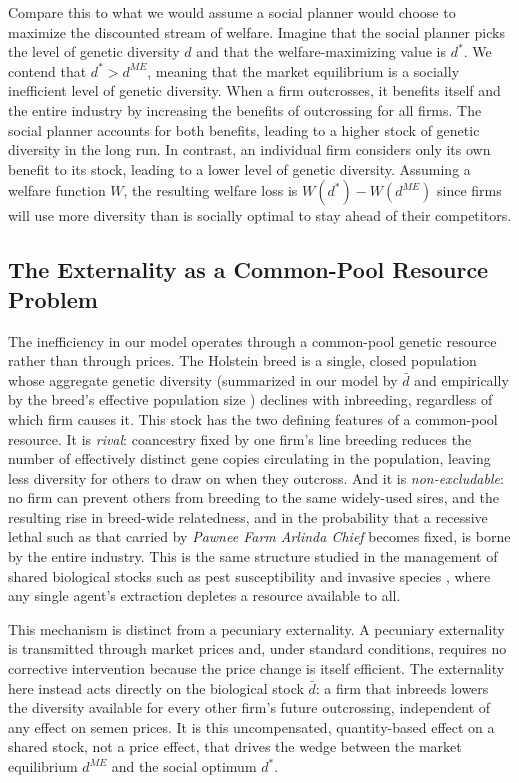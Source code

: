 \documentclass[12pt,letterpaper]{article}
\begin{document}
Compare this to what we would assume a social planner would choose to maximize the discounted stream of welfare. Imagine that the social planner picks the level of genetic diversity $d$ and that the welfare-maximizing value is $d^{*}$. We contend that $d^*>d^{ME}$, meaning that the market equilibrium is a socially inefficient level of genetic diversity. When a firm outcrosses, it benefits itself and the entire industry by increasing the benefits of outcrossing for all firms. The social planner accounts for both benefits, leading to a higher stock of genetic diversity in the long run. In contrast, an individual firm considers only its own benefit to its stock, leading to a lower level of genetic diversity. Assuming a welfare function $W$, the resulting welfare loss is $W(d^*)-W(d^{ME})$ since firms will use more diversity than is socially optimal to stay ahead of their competitors.

\subsection{The Externality as a Common-Pool Resource Problem}

The inefficiency in our model operates through a common-pool genetic resource rather than through prices. The Holstein breed is a single, closed population whose aggregate genetic diversity (summarized in our model by $\bar{d}$ and empirically by the breed's effective population size \citep{Makanjuola2020}) declines with inbreeding, regardless of which firm causes it. This stock has the two defining features of a common-pool resource. It is \emph{rival}: coancestry fixed by one firm's line breeding reduces the number of effectively distinct gene copies circulating in the population, leaving less diversity for others to draw on when they outcross. And it is \emph{non-excludable}: no firm can prevent others from breeding to the same widely-used sires, and the resulting rise in breed-wide relatedness, and in the probability that a recessive lethal such as that carried by \textit{Pawnee Farm Arlinda Chief} \citep{Adams2016} becomes fixed, is borne by the entire industry. This is the same structure studied in the management of shared biological stocks such as pest susceptibility and invasive species \citep{epanchin2015individual}, where any single agent's extraction depletes a resource available to all.

This mechanism is distinct from a pecuniary externality. A pecuniary externality is transmitted through market prices and, under standard conditions, requires no corrective intervention because the price change is itself efficient. The externality here instead acts directly on the biological stock $\bar{d}$: a firm that inbreeds lowers the diversity available for every other firm's future outcrossing, independent of any effect on semen prices. It is this uncompensated, quantity-based effect on a shared stock, not a price effect, that drives the wedge between the market equilibrium $d^{ME}$ and the social optimum $d^{*}$.
\end{document}
